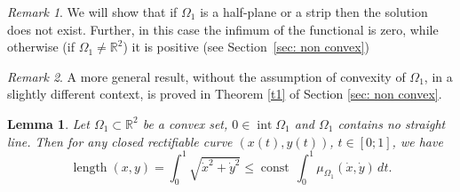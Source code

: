 \documentclass[a4paper,12pt]{article}
\DeclareMathOperator{\const}{const}
\newcommand {\R}{{\mathbb R}}
\newtheorem{lemma}{Lemma}
\theoremstyle{remark}
\newtheorem{remark}{Remark}
\theoremstyle{definition}
\begin{document}
\begin{remark}
We will show that if $\Omega_1$ is a half-plane or a strip then the solution does not exist. Further, in this case the infimum of the functional is zero, while otherwise (if $\Omega_1 \ne \mathbb{R}^2$) it is positive (see Section~\ref{sec: non convex})
\end{remark}

\begin{remark}
A more general result, without the assumption of convexity of $\Omega_1$, in a slightly different context, is proved in Theorem \ref{t1} of Section \ref{sec: non convex}.
\end{remark}

\begin{lemma}
	\label{lm: length is bounded}
	Let $\Omega_1\subset\R^2$ be a convex set, $0\in\operatorname{int}\Omega_1$ and $\Omega_1$ contains no straight line. Then for any closed rectifiable curve $(x(t),y(t))$, $t\in[0;1]$, we have
	$$
	\operatorname{length}(x,y)=
	\int_0^1\sqrt{\dot x^2+\dot y^2}\le
	\const\,\int_0^1\mu_{\Omega_1}(\dot x,\dot y)\,dt.
	$$
\end{lemma}
\end{document}
